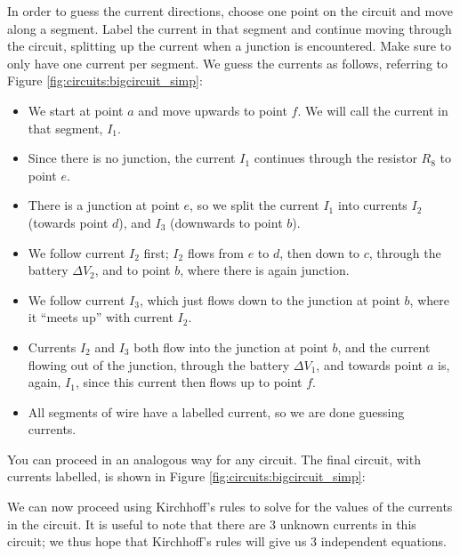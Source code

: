 In order to guess the current directions, choose one point on the circuit and move along a segment. Label the current in that segment and continue moving through the circuit, splitting up the current when a junction is encountered. Make sure to only have one current per segment. We guess the currents as follows, referring to Figure \ref{fig:circuits:bigcircuit_simp}:
\begin{itemize}
\item We start at point $a$ and move upwards to point $f$. We will call the current in that segment, $I_1$.
\item Since there is no junction, the current $I_1$ continues through the resistor $R_8$ to point $e$. 
\item There is a junction at point $e$, so we split the current $I_1$ into currents $I_2$ (towards point $d$), and $I_3$ (downwards to point $b$).
\item We follow current $I_2$ first; $I_2$ flows from $e$ to $d$, then down to $c$, through the battery $\Delta V_2$, and to point $b$, where there is again junction. 
\item We follow current $I_3$, which just flows down to the junction at point $b$, where it ``meets up'' with current $I_2$. 
\item Currents $I_2$ and $I_3$ both flow into the junction at point $b$, and the current flowing out of the junction, through the battery $\Delta V_1$, and towards point $a$ is, again, $I_1$, since this current then flows up to point $f$. 
\item All segments of wire have a labelled current, so we are done guessing currents.
\end{itemize}  
You can proceed in an analogous way for any circuit. The final circuit, with currents labelled, is shown in Figure \ref{fig:circuits:bigcircuit_simp}:


We can now proceed using Kirchhoff's rules to solve for the values of the currents in the circuit. It is useful to note that there are 3 unknown currents in this circuit; we thus hope that Kirchhoff's rules will give us 3 independent equations.

